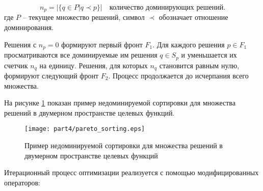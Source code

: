 \begin{equation*}
n_p = |\{q \in P | q \prec p\}| \quad \text{количество доминирующих решений}.
\end{equation*}
где $P$ -- текущее множество решений, символ $\prec$ обозначает отношение доминирования.

Решения с $n_p = 0$ формируют первый фронт $F_1$. Для каждого решения $p \in F_1$ просматриваются
все доминируемые им решения $q \in S_p$ и уменьшается их счетчик $n_q$ на единицу.
Решения, для которых $n_q$ становится равным нулю, формируют следующий
фронт $F_2$. Процесс продолжается до исчерпания всего множества.

На рисунке \ref{fig:pareto_sorting} показан пример недоминируемой сортировки для множества решений в двумерном пространстве целевых функций.

\begin{figure}[ht]
    \centering
    \texttt{[image: part4/pareto\_sorting.eps]}
    \caption{Пример недоминируемой сортировки для множества решений в двумерном пространстве целевых функций}
    \label{fig:pareto_sorting}
\end{figure}

Итерационный процесс оптимизации реализуется с помощью модифицированных операторов:

